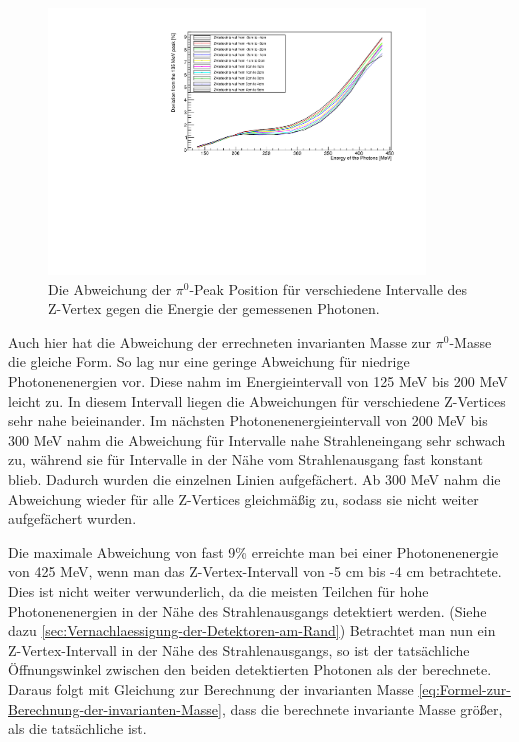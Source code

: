 \documentclass[a4paper,11pt,oneside,final,german,openbib,pdftex]{scrbook}
\begin{document}
{\begin{figure}[h!]
	\begin{center}
		\includegraphics[width=100mm]{20171804ZVertexDeviation}
		\caption{Die Abweichung der $\pi^0$-Peak Position für verschiedene Intervalle des Z-Vertex gegen die Energie der gemessenen Photonen.}
		\label{fig:Z-Vertex-Multi-Graph}
	\end{center}
\end{figure}

Auch hier hat die Abweichung der errechneten invarianten Masse zur $\pi^0$-Masse die gleiche Form. So lag nur eine geringe Abweichung für niedrige Photonenenergien vor. Diese nahm im Energieintervall von 125 MeV bis 200 MeV leicht zu. In diesem Intervall liegen die Abweichungen für verschiedene Z-Vertices sehr nahe beieinander. Im nächsten Photonenenergieintervall von 200 MeV bis 300 MeV nahm die Abweichung für Intervalle nahe Strahleneingang sehr schwach zu, während sie für Intervalle in der Nähe vom Strahlenausgang fast konstant blieb. Dadurch wurden die einzelnen Linien aufgefächert. Ab 300 MeV nahm die Abweichung wieder für alle Z-Vertices gleichmäßig zu, sodass sie nicht weiter aufgefächert wurden. 

Die maximale Abweichung von fast 9\% erreichte man bei einer Photonenenergie von 425 MeV, wenn man das Z-Vertex-Intervall von -5 cm bis -4 cm betrachtete. Dies ist nicht weiter verwunderlich, da die meisten Teilchen für hohe Photonenenergien in der Nähe des Strahlenausgangs detektiert werden. (Siehe dazu \ref{sec:Vernachlaessigung-der-Detektoren-am-Rand}) Betrachtet man nun ein Z-Vertex-Intervall in der Nähe des Strahlenausgangs, so ist der tatsächliche Öffnungswinkel zwischen den beiden detektierten Photonen als der berechnete. Daraus folgt mit Gleichung zur Berechnung der invarianten Masse \ref{eq:Formel-zur-Berechnung-der-invarianten-Masse}, dass die berechnete invariante Masse größer, als die tatsächliche ist.

}
\end{document}
